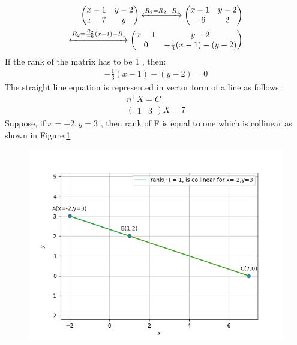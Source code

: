\documentclass[12pt]{article}
\newcommand{\myvec}[1]{\ensuremath{\begin{pmatrix}#1\end{pmatrix}}}
\begin{document}
\begin{align}
\label{eq:chem_balance_mat_row}
\myvec{
x-1 & y-2
\\
x-7 & y
}
\xleftrightarrow[]{R_2 = R_2-R_1}
\myvec{
  x-1 & y-2
  \\
	  -6 & 2                 
	  }
	  \\
	\xleftrightarrow[]{R_2 = \frac{R_2}{-6}(x-1)-R_1}
\myvec{
x-1 & y-2
\\
	0 & -\frac{1}{3}(x-1)-(y-2)
}
\end{align}
If the rank of the matrix has to be 1 , then:
\begin{align}
-\frac{1}{3}(x-1)-(y-2)=0
\end{align}
The straight line equation is represented in vector form of a line as follows: 
\begin{align}
		n^{\top}X=C\\
		\myvec{1 & 3}X=7
\end{align}
Suppose, if $x=-2,y=3$ , then rank of F is equal to one which is collinear as shown in Figure:\ref    {fig:Fig}
\begin{figure}[!h]
	\begin{center} 
	    \includegraphics[width=\columnwidth]{./figs/sc1.png}
	\end{center}
\caption{}
\label{fig:Fig}
\end{figure}
\end{document}
